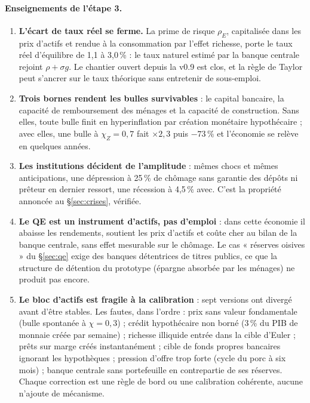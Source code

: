\documentclass[11pt,a4paper]{article}
\begin{document}
\paragraph{Enseignements de l'étape 3.}
\begin{enumerate}
\item \textbf{L'écart de taux réel se ferme.} La prime de risque $\rho_E$, capitalisée dans les prix d'actifs et rendue à la consommation par l'effet richesse, porte le taux réel d'équilibre de 1,1 à 3,0\,\% : le taux naturel estimé par la banque centrale rejoint $\rho+\sigma g$. Le chantier ouvert depuis la v0.9 est clos, et la règle de Taylor peut s'ancrer sur le taux théorique sans entretenir de sous-emploi.
\item \textbf{Trois bornes rendent les bulles survivables} : le capital bancaire, la capacité de remboursement des ménages et la capacité de construction. Sans elles, toute bulle finit en hyperinflation par création monétaire hypothécaire ; avec elles, une bulle à $\chi_Z=0{,}7$ fait $\times2{,}3$ puis $-73\,\%$ et l'économie se relève en quelques années.
\item \textbf{Les institutions décident de l'amplitude} : mêmes chocs et mêmes anticipations, une dépression à 25\,\% de chômage sans garantie des dépôts ni prêteur en dernier ressort, une récession à 4,5\,\% avec. C'est la propriété annoncée au \S\ref{sec:crises}, vérifiée.
\item \textbf{Le QE est un instrument d'actifs, pas d'emploi} : dans cette économie il abaisse les rendements, soutient les prix d'actifs et coûte cher au bilan de la banque centrale, sans effet mesurable sur le chômage. Le cas « réserves oisives » du \S\ref{sec:qe} exige des banques détentrices de titres publics, ce que la structure de détention du prototype (épargne absorbée par les ménages) ne produit pas encore.
\item \textbf{Le bloc d'actifs est fragile à la calibration} : sept versions ont divergé avant d'être stables. Les fautes, dans l'ordre : prix sans valeur fondamentale (bulle spontanée à $\chi=0{,}3$) ; crédit hypothécaire non borné (3\,\% du PIB de monnaie créée par semaine) ; richesse illiquide entrée dans la cible d'Euler ; prêts sur marge créés instantanément ; cible de fonds propres bancaires ignorant les hypothèques ; pression d'offre trop forte (cycle du porc à six mois) ; banque centrale sans portefeuille en contrepartie de ses réserves. Chaque correction est une règle de bord ou une calibration cohérente, aucune n'ajoute de mécanisme.
\end{enumerate}
\end{document}

